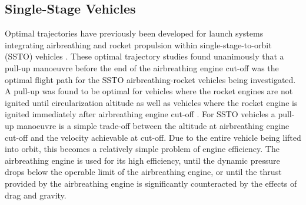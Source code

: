 \subsection{Single-Stage Vehicles}

Optimal trajectories have previously been developed for launch systems integrating airbreathing and rocket propulsion within single-stage-to-orbit (SSTO) vehicles \cite{Powell1991,Lu1993,Trefny1999}. These optimal trajectory studies found unanimously that a pull-up manoeuvre before the end of the airbreathing engine cut-off was the optimal flight path for the SSTO airbreathing-rocket vehicles being investigated. A pull-up was found to be optimal for vehicles where the rocket engines are not ignited until circularization altitude \cite{Powell1991,Lu1993} as well as vehicles where the rocket engine is ignited immediately after airbreathing engine cut-off \cite{Trefny1999}. For SSTO vehicles a pull-up manoeuvre is a simple trade-off between the altitude at airbreathing engine cut-off and the velocity achievable at cut-off. Due to the entire vehicle being lifted into orbit, this becomes a relatively simple problem of engine efficiency. The airbreathing engine is used for its high efficiency, until the dynamic pressure drops below the operable limit of the airbreathing engine, or until the thrust provided by the airbreathing engine is significantly counteracted by the effects of drag and gravity. 
